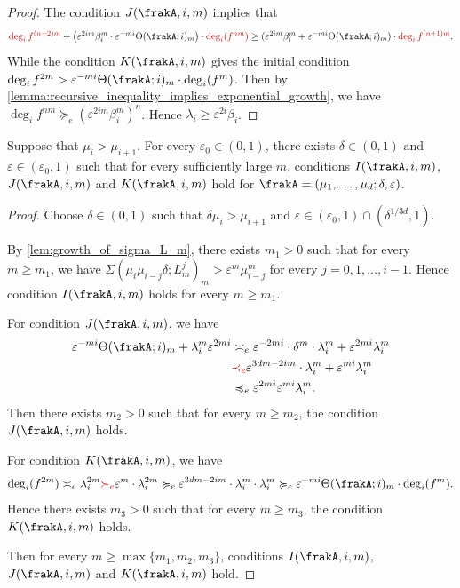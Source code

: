 \begin{proof}
    The condition $J(\frakA,i,m)$ implies that
    \[ \alert{\deg_i f^{(n+2)m}} + \left(\varepsilon^{2im} \beta_i^m \cdot \varepsilon^{-mi} \Theta(\frakA; i)_m\right) \cdot \alert{\deg_i(f^{nm})} \geq (\varepsilon^{2im} \beta_i^m + \varepsilon^{-mi} \Theta(\frakA; i)_m) \cdot \alert{\deg_i f^{(n+1)m}}. \]
    While the condition $K(\frakA,i,m)$ gives the initial condition $\deg_i f^{2m} > \varepsilon^{-mi} \Theta(\frakA; i)_m \cdot \deg_i(f^{m})$.
    Then by \cref{lemma:recursive_inequality_implies_exponential_growth}, we have $\deg_i f^{nm} \succcurlyeq_e (\varepsilon^{2im} \beta_i^m)^n$.
    Hence $\lambda_i \geq \varepsilon^{2i} \beta_i$.
  \end{proof}

  
  \begin{theorem}\label{thm:lambda_i_satisfy_conditions_IJK}
    Suppose that $\mu_i > \mu_{i+1}$.
    For every $\varepsilon_0 \in (0, 1)$, there exists $\delta \in (0, 1)$ and $\varepsilon \in (\varepsilon_0, 1)$ such that for every sufficiently large $m$, conditions $I(\frakA,i,m)$, $J(\frakA,i,m)$ and $K(\frakA,i,m)$ hold for $\frakA = (\mu_1, \ldots, \mu_d; \delta, \varepsilon)$.
  \end{theorem}
  \begin{proof}
    Choose $\delta \in (0, 1)$ such that $\delta \mu_i > \mu_{i+1}$ and $\varepsilon \in (\varepsilon_0, 1) \cap (\delta^{1/3d}, 1)$.

    By \cref{lem:growth_of_sigma_L_m}, there exists $m_1 > 0$ such that for every $m \geq m_1$, we have $\Sigma(\mu_i \mu_{i-j} \delta; L_m^j)_m > \varepsilon^m \mu_{i-j}^m$ for every $j = 0, 1, \ldots, i-1$.
    Hence condition $I(\frakA,i,m)$ holds for every $m \geq m_1$.

    For condition $J(\frakA,i,m)$, we have
    \begin{align*}
      \varepsilon^{-mi}\Theta(\frakA; i)_m + \lambda_i^m \varepsilon^{2mi} & \asymp_e \varepsilon^{-2mi} \cdot \delta^m \cdot \lambda_i^m + \varepsilon^{2mi} \lambda_i^m \\
      & \alert{\prec_e} \varepsilon^{3dm-2im} \cdot \lambda_i^m + \varepsilon^{mi} \lambda_i^m \\
      & \preccurlyeq_e \varepsilon^{2mi} \varepsilon^{mi} \lambda_i^m.
    \end{align*}
    Then there exists $m_2 > 0$ such that for every $m \geq m_2$, the condition $J(\frakA,i,m)$ holds.

    For condition $K(\frakA,i,m)$, we have
    \begin{align*}
      \deg_i(f^{2m}) \asymp_e \lambda_i^{2m} \alert{\succ_e} \varepsilon^{m} \cdot \lambda_i^{2m} \succcurlyeq_e \varepsilon^{3dm-2im} \cdot \lambda_i^m \cdot \lambda_i^m \succcurlyeq_e \varepsilon^{-mi} \Theta(\frakA; i)_m \cdot \deg_i(f^{m}).
    \end{align*}
    Hence there exists $m_3 > 0$ such that for every $m \geq m_3$, the condition $K(\frakA,i,m)$ holds.

    Then for every $m \geq \max\{m_1, m_2, m_3\}$, conditions $I(\frakA,i,m)$, $J(\frakA,i,m)$ and $K(\frakA,i,m)$ hold.
  \end{proof}

